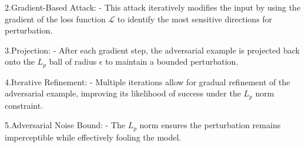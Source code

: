 2.Gradient-Based Attack:
   - This attack iteratively modifies the input by using the gradient of the loss function $\mathcal{L}$ to identify the most sensitive directions for perturbation.

3.Projection:
   - After each gradient step, the adversarial example is projected back onto the $L_p$ ball of radius $\epsilon$ to maintain a bounded perturbation.

4.Iterative Refinement:
   - Multiple iterations allow for gradual refinement of the adversarial example, improving its likelihood of success under the $L_p$ norm constraint.

5.Adversarial Noise Bound:
   - The $L_p$ norm ensures the perturbation remains imperceptible while effectively fooling the model.